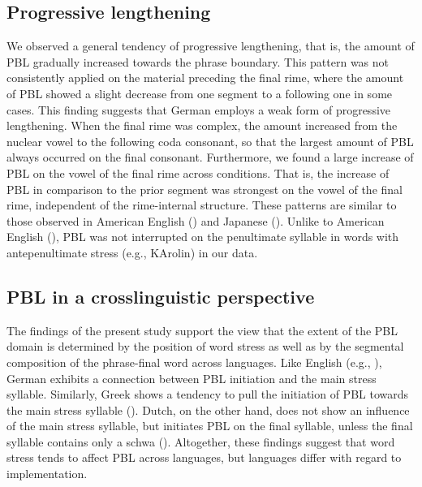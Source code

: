 \documentclass[output=paper]{langscibook}
\begin{document}
\subsection{Progressive lengthening}
We observed a general tendency of progressive lengthening, that is, the amount of PBL gradually increased towards the phrase boundary. This pattern was not consistently applied on the material preceding the final rime, where the amount of PBL showed a slight decrease from one segment to a following one in some cases. This finding suggests that German employs a weak form of progressive lengthening. When the final rime was complex, the amount increased from the nuclear vowel to the following coda consonant, so that the largest amount of PBL always occurred on the final consonant. Furthermore, we found a large increase of PBL on the vowel of the final rime across conditions. That is, the increase of PBL in comparison to the prior segment was strongest on the vowel of the final rime, independent of the rime-internal structure. These patterns are similar to those observed in American English (\citealt{TurkShattuck-Hufnagel2007}) and Japanese (\citealt{SeoEtal2019}). Unlike to American English (\citealt{TurkShattuck-Hufnagel2007}), PBL was not interrupted on the penultimate syllable in words with antepenultimate stress (e.g., KArolin) in our data.

\subsection{PBL in a crosslinguistic perspective}
The findings of the present study support the view that the extent of the PBL domain is determined by the position of word stress as well as by the segmental composition of the phrase-final word across languages. Like English (e.g., \citealt{White2002, TurkShattuck-Hufnagel2007}), German exhibits a connection between PBL initiation and the main stress syllable. Similarly, Greek shows a tendency to pull the initiation of PBL towards the main stress syllable (\citealt{Katsika2016}). Dutch, on the other hand, does not show an influence of the main stress syllable, but initiates PBL on the final syllable, unless the final syllable contains only a schwa (\citealt{Cambier-Langeveld1997}). Altogether, these findings suggest that word stress tends to affect PBL across languages, but languages differ with regard to implementation.
\end{document}
